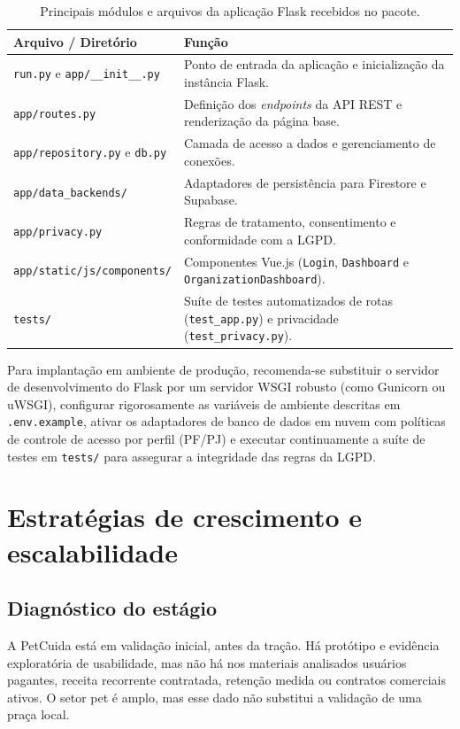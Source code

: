 \documentclass[12pt,a4paper]{article}
\begin{document}
\begin{table}[H]
\centering
\caption{Principais módulos e arquivos da aplicação Flask recebidos no pacote.}
\begin{tabularx}{\textwidth}{p{4.5cm}Y}
\toprule
\textbf{Arquivo / Diretório} & \textbf{Função}\\
\midrule
\texttt{run.py} e \texttt{app/\_\_init\_\_.py} & Ponto de entrada da aplicação e inicialização da instância Flask.\\
\texttt{app/routes.py} & Definição dos \textit{endpoints} da API REST e renderização da página base.\\
\texttt{app/repository.py} e \texttt{db.py} & Camada de acesso a dados e gerenciamento de conexões.\\
\texttt{app/data\_backends/} & Adaptadores de persistência para Firestore e Supabase.\\
\texttt{app/privacy.py} & Regras de tratamento, consentimento e conformidade com a LGPD.\\
\texttt{app/static/js/components/} & Componentes Vue.js (\texttt{Login}, \texttt{Dashboard} e \texttt{OrganizationDashboard}).\\
\texttt{tests/} & Suíte de testes automatizados de rotas (\texttt{test\_app.py}) e privacidade (\texttt{test\_privacy.py}).\\
\bottomrule
\end{tabularx}
\end{table}

Para implantação em ambiente de produção, recomenda-se substituir o servidor de desenvolvimento do Flask por um servidor WSGI robusto (como Gunicorn ou uWSGI), configurar rigorosamente as variáveis de ambiente descritas em \texttt{.env.example}, ativar os adaptadores de banco de dados em nuvem com políticas de controle de acesso por perfil (PF/PJ) e executar continuamente a suíte de testes em \texttt{tests/} para assegurar a integridade das regras da LGPD.


\section{Estratégias de crescimento e escalabilidade}
\subsection{Diagnóstico do estágio}
A PetCuida está em validação inicial, antes da tração. Há protótipo e evidência exploratória de usabilidade, mas não há nos materiais analisados usuários pagantes, receita recorrente contratada, retenção medida ou contratos comerciais ativos. O setor pet é amplo, mas esse dado não substitui a validação de uma praça local.
\end{document}
